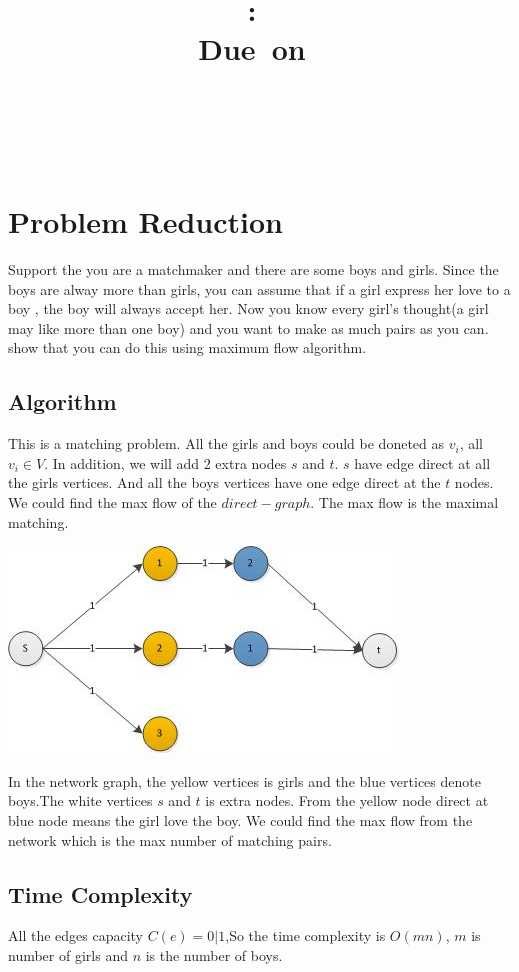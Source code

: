 \documentclass{article}
\title{
\vspace{2in}
\textmd{\textbf{\hmwkClass:\ \hmwkTitle}}\\
\normalsize\vspace{0.1in}\small{Due\ on\ \hmwkDueDate}\\
\vspace{0.1in}\large{\textit{\hmwkClassInstructor\ \hmwkClassTime}}
\vspace{3in}
}
\author{\textbf{\hmwkAuthorName}\\\textbf{\hmwkAuthorStuID}}
\date{} %
\numberwithin{equation}{section}
\begin{document}
\maketitle
\newpage


%
%
\section{Problem Reduction}
Support the you are a matchmaker and there are some boys and girls. 
Since the boys are alway more than girls, you can assume that 
if a girl express her love to a boy , the boy will always accept her. 
Now you know every girl’s thought(a girl may like more than one boy) and 
you want to make as much pairs as you can. show that you can do this 
using maximum flow algorithm.
    \subsection{Algorithm}
    This is a matching problem. All the girls and boys could be doneted as $v_i$, all $v_i \in V$. 
    In addition, we will add $2$ extra nodes $s$ and $t$. $s$ have edge direct at all the girls vertices. 
    And all the boys vertices have one edge direct at the $t$ nodes. 
    We could find the max flow of the $direct-graph$. The max flow is the maximal matching.
    \begin{center}
            \includegraphics[width=0.75\columnwidth]{boysgirlsmatching} %
    \end{center} 
    In the network graph, the yellow vertices is girls and the blue vertices denote boys.The white vertices $s$ and $t$ is extra nodes. From the yellow node direct at blue node means the girl love the boy. We could find the max flow from the network which is the max number of matching pairs.
    \subsection{Time Complexity}
    All the edges capacity $C(e) = {0|1}$,So the time complexity is $O(mn)$, $m$ is number of girls and $n$ is the number of boys.
%
%
\end{document}
